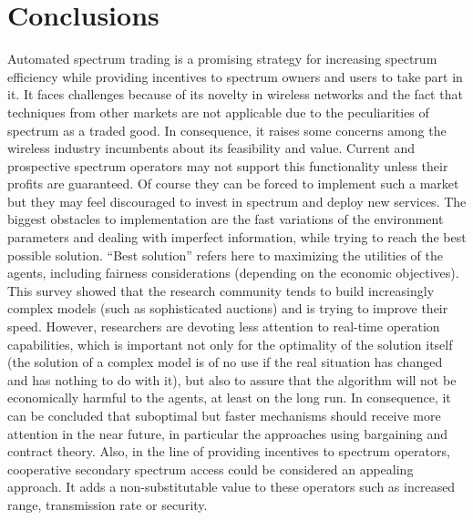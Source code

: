 \section{Conclusions}
\label{sec:Conclusions}

Automated spectrum trading is a promising strategy for increasing spectrum efficiency while providing incentives to spectrum owners and users to take part in it.
It faces challenges because of its novelty in wireless networks and the fact that techniques from other markets are not applicable due to the peculiarities of spectrum as a traded good.
In consequence, it raises some concerns among the wireless industry incumbents about its feasibility and value.
Current and prospective spectrum operators may not support this functionality unless their profits are guaranteed. Of course they can be forced to implement such a market but they may feel discouraged to invest in spectrum and deploy new services. The biggest obstacles to implementation are the fast variations of the environment parameters and dealing with imperfect information, while trying to reach the best possible solution. ``Best solution'' refers here to maximizing the utilities of the agents, including fairness considerations (depending on the economic objectives). 
This survey showed that the research community tends to build increasingly complex models (such as sophisticated auctions) and is trying to improve their speed. However, researchers are devoting less attention to real-time operation capabilities, which is important not only for the optimality of the solution itself (the solution of a complex model is of no use if the real situation has changed and has nothing to do with it), but also to assure that the algorithm will not be economically harmful to the agents, at least on the long run. In consequence, it can be concluded that suboptimal but faster mechanisms should receive more attention in the near future, in particular the approaches using bargaining and contract theory. 
Also, in the line of providing incentives to spectrum operators, cooperative secondary spectrum access could be considered an appealing approach. It adds a non-substitutable value to these operators such as increased range, transmission rate or security.
